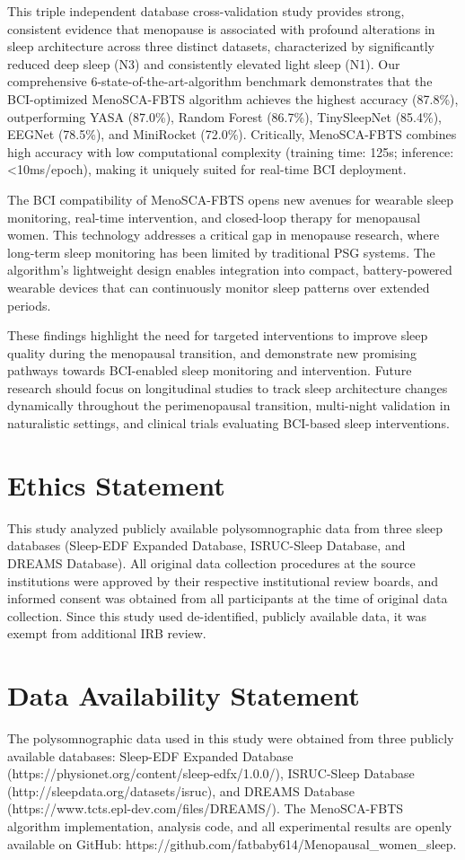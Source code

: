 \documentclass[a4paper,fleqn]{cas-dc}
\begin{document}
This triple independent database cross-validation study provides strong, consistent evidence that menopause is associated with profound alterations in sleep architecture across three distinct datasets, characterized by significantly reduced deep sleep (N3) and consistently elevated light sleep (N1). Our comprehensive 6-state-of-the-art-algorithm benchmark demonstrates that the BCI-optimized MenoSCA-FBTS algorithm achieves the highest accuracy (87.8\%), outperforming YASA (87.0\%), Random Forest (86.7\%), TinySleepNet (85.4\%), EEGNet (78.5\%), and MiniRocket (72.0\%). Critically, MenoSCA-FBTS combines high accuracy with low computational complexity (training time: 125s; inference: <10ms/epoch), making it uniquely suited for real-time BCI deployment.

The BCI compatibility of MenoSCA-FBTS opens new avenues for wearable sleep monitoring, real-time intervention, and closed-loop therapy for menopausal women. This technology addresses a critical gap in menopause research, where long-term sleep monitoring has been limited by traditional PSG systems. The algorithm's lightweight design enables integration into compact, battery-powered wearable devices that can continuously monitor sleep patterns over extended periods.

These findings highlight the need for targeted interventions to improve sleep quality during the menopausal transition, and demonstrate new promising pathways towards BCI-enabled sleep monitoring and intervention. Future research should focus on longitudinal studies to track sleep architecture changes dynamically throughout the perimenopausal transition, multi-night validation in naturalistic settings, and clinical trials evaluating BCI-based sleep interventions.

\section*{Ethics Statement}
This study analyzed publicly available polysomnographic data from three sleep databases (Sleep-EDF Expanded Database, ISRUC-Sleep Database, and DREAMS Database). All original data collection procedures at the source institutions were approved by their respective institutional review boards, and informed consent was obtained from all participants at the time of original data collection. Since this study used de-identified, publicly available data, it was exempt from additional IRB review.

\section*{Data Availability Statement}
The polysomnographic data used in this study were obtained from three publicly available databases: Sleep-EDF Expanded Database (https://physionet.org/content/sleep-edfx/1.0.0/), ISRUC-Sleep Database (http://sleepdata.org/datasets/isruc), and DREAMS Database (https://www.tcts.epl-dev.com/files/DREAMS/). The MenoSCA-FBTS algorithm implementation, analysis code, and all experimental results are openly available on GitHub: https://github.com/fatbaby614/Menopausal_women_sleep.
\end{document}
